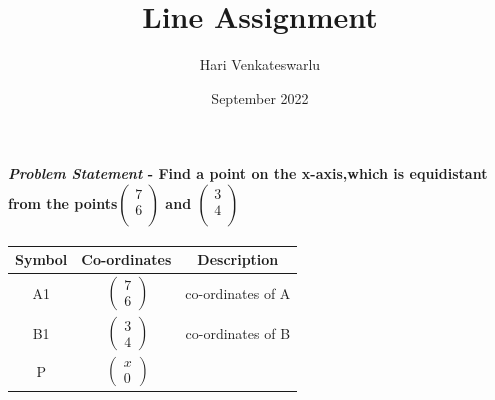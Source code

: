 \documentclass[journal,10pt,twocolumn]{article}
\title{\textbf{Line Assignment}}
\author{Hari Venkateswarlu}
\date{September 2022}
\begin{document}
\maketitle
\paragraph{\textit{Problem Statement} - Find a point on the x-axis,which is equidistant from the points$\begin{pmatrix}
  7 \\
  6 \\
 \end{pmatrix}$ and $\begin{pmatrix}
  3 \\
  4 \\
 \end{pmatrix}$}
\begin{center}
    \label{tab:truthtable}
    \setlength{\arrayrulewidth}{0.2mm}
\setlength{\tabcolsep}{5pt}
\renewcommand{\arraystretch}{1.25}
    \begin{tabular}{|c|c|c|}
    \hline %
      \large\textbf{Symbol} & \large\textbf{Co-ordinates} & \large\textbf{Description}\\
      \hline
       \large A1 & $\ \begin{pmatrix} 7\\ 6 \end{pmatrix}$ & co-ordinates of A \\
       \large B1 & $\ \begin{pmatrix} 3\\ 4 \end{pmatrix}$ & co-ordinates of B \\
	
	\large P & $\ \begin{pmatrix} x \\ 0 \end{pmatrix}$ &\makecell {lying on x-axis } \\
      \hline
   \end{tabular}
 \end{center}\vspace{5mm}
\end{document}
